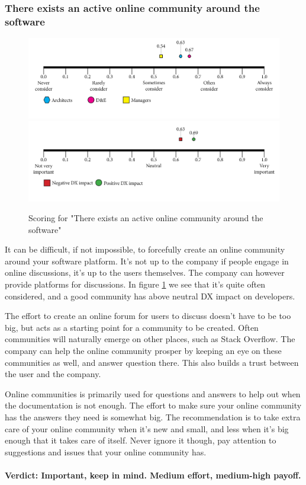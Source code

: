 \documentclass{article}
\begin{document}
\subsubsection{There exists an active online community around the software}
\begin{figure}[H]
\centering
\includegraphics[width=\linewidth]{scorelines/aspect16.png}
\includegraphics[width=\linewidth]{dxscorelines/dxaspect16.png}
\caption{Scoring for "There exists an active online community around the software"}
\label{fig:aspect16}
\end{figure}
It can be difficult, if not impossible, to forcefully create an online community around your software platform. It's not up to the company if people engage in online discussions, it's up to the users themselves. The company can however provide platforms for discussions. In figure \ref{fig:aspect16} we see that it's quite often considered, and a good community has above neutral DX impact on developers. 

The effort to create an online forum for users to discuss doesn't have to be too big, but acts as a starting point for a community to be created. Often communities will naturally emerge on other places, such as Stack Overflow. The company can help the online community prosper by keeping an eye on these communities as well, and answer question there. This also builds a trust between the user and the company.

Online communities is primarily used for questions and answers to help out when the documentation is not enough. The effort to make sure your online community has the answers they need is somewhat big. The recommendation is to take extra care of your online community when it's new and small, and less when it's big enough that it takes care of itself. Never ignore it though, pay attention to suggestions and issues that your online community has. \\ \\
\textbf{Verdict: Important, keep in mind. Medium effort, medium-high payoff.}
\end{document}
